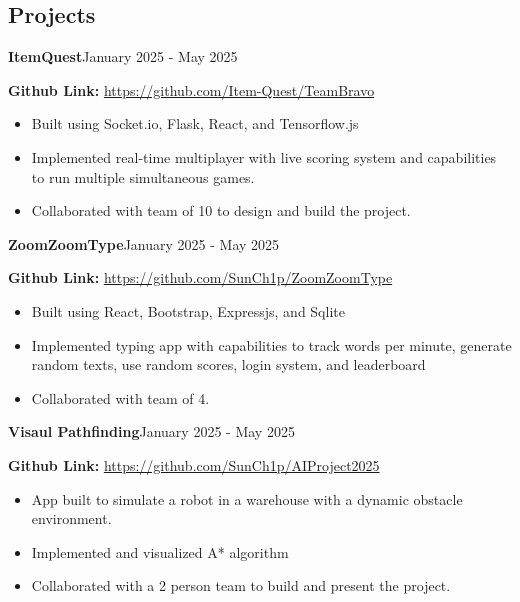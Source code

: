 \documentclass[11pt]{article}
\newcommand{\project}[4]{
    \noindent \textbf{#1}\normalsize \hfill #2
    \par
    \noindent #3
    #4
}
\begin{document}
\begin{spacing}{1}
        \section*{\Large \textbf{Projects}}
        \normalsize
        \project{ItemQuest}{January 2025 - May 2025}{\textbf{Github Link:} \url{https://github.com/Item-Quest/TeamBravo}}
        {
            \begin{itemize}
                \setlength\itemsep{0.01em}
                \item Built using Socket.io, Flask, React, and Tensorflow.js \par
                \item Implemented real-time multiplayer with live scoring system and capabilities to run multiple simultaneous games. \par
                \item Collaborated with team of 10 to design and build the project.
            \end{itemize}
            \par
        }
        \project{ZoomZoomType}{January 2025 - May 2025}{\textbf{Github Link:} \url{https://github.com/SunCh1p/ZoomZoomType}}
        {
            \begin{itemize}
                \setlength\itemsep{0.01em}
                \item Built using React, Bootstrap, Expressjs, and Sqlite \par
                \item Implemented typing app with capabilities to track words per minute, generate random texts, use random scores, login system, and leaderboard  \par
                \item Collaborated with team of 4.
            \end{itemize}
            \par
        }
        \project{Visaul Pathfinding}{January 2025 - May 2025}{\textbf{Github Link:} \url{https://github.com/SunCh1p/AIProject2025}}
        {
            \begin{itemize}
                \setlength\itemsep{0.01em}
                \item App built to simulate a robot in a warehouse with a dynamic obstacle environment.
                \item Implemented and visualized A* algorithm  \par
                \item Collaborated with a 2 person team to build and present the project.

\end{itemize}}
\end{spacing}
\end{document}

